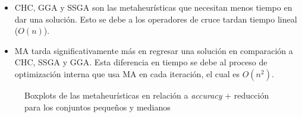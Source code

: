 \begin{itemize}

\item CHC, GGA y SSGA son las metaheurísticas que necesitan menos tiempo en dar una solución. Esto se debe a los operadores de cruce tardan tiempo lineal ($O(n)$).



\item MA tarda significativamente más en regresar una solución en comparación a CHC, SSGA y GGA. Esta diferencia en tiempo se debe al proceso de optimización interna que usa MA en cada iteración, el cual es $O(n^2)$.


\end{itemize}


\begin{figure}[h!]

	\centering

\caption{Boxplots de las metaheurísticas en relación a \emph{accuracy} + reducción para los conjuntos pequeños y medianos}
\label{small-medium-heuristics}
\end{figure}


